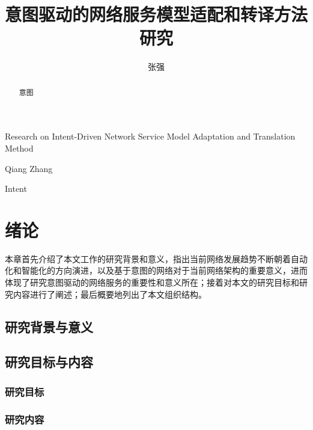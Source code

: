 \documentclass[algorithmlist, figurelist,tablelist, nomlist,engineering]{seuthesix}
\begin{document}
\title{意图驱动的网络服务模型适配和转译方法研究}{}{Research on Intent-Driven Network Service Model Adaptation and Translation Method}{}
\author{张强}{Qiang Zhang}
\authorizedate{\today}
\committeechair{}
\reviewer{}{}
\makebigcover
\makecover
\begin{abstract}{意图}

\end{abstract}

\begin{englishabstract}{Intent}
	
\end{englishabstract}

\tableofcontents
\listofothers

\mainmatter

\chapter{绪论}
本章首先介绍了本文工作的研究背景和意义，指出当前网络发展趋势不断朝着自动化和智能化的方向演进，以及基于意图的网络对于当前网络架构的重要意义，进而体现了研究意图驱动的网络服务的重要性和意义所在；接着对本文的研究目标和研究内容进行了阐述；最后概要地列出了本文组织结构。\par
\section{研究背景与意义}

\section{研究目标与内容}
\subsection{研究目标}

\subsection{研究内容}
\end{document}
